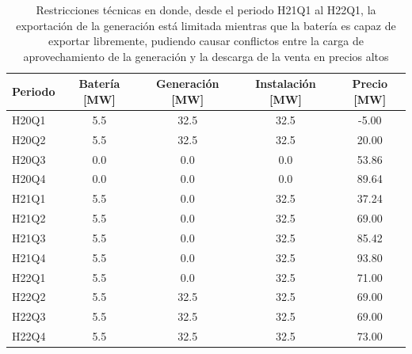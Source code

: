 \begin{table}[ht]
  \centering
  \begin{tabular}{|l|S[table-format=4.1]|S[table-format=4.1]|S[table-format=4.1]|S[table-format=4.2]|}
    \hline
    Periodo & {Batería [\si{\mega\watt}]} & {Generación [\si{\mega\watt}]} & {Instalación [\si{\mega\watt}]}  & {Precio [\si{\mega\watt}]}\\
    \hline
    H20Q1   & 5.5                       & 32.5                         & 32.5                           & -5.00\\
    H20Q2   & 5.5                       & 32.5                         & 32.5                           & 20.00\\
    H20Q3   & 0.0                       &  0.0                         &  0.0                           & 53.86\\
    H20Q4   & 0.0                       &  0.0                         &  0.0                           & 89.64\\
    H21Q1   & 5.5                       &  0.0                         & 32.5                           & 37.24\\
    H21Q2   & 5.5                       &  0.0                         & 32.5                           & 69.00\\
    H21Q3   & 5.5                       &  0.0                         & 32.5                           & 85.42\\
    H21Q4   & 5.5                       &  0.0                         & 32.5                           & 93.80\\
    H22Q1   & 5.5                       &  0.0                         & 32.5                           & 71.00\\
    H22Q2   & 5.5                       & 32.5                         & 32.5                           & 69.00\\
    H22Q3   & 5.5                       & 32.5                         & 32.5                           & 69.00\\
    H22Q4   & 5.5                       & 32.5                         & 32.5                           & 73.00\\
    \hline
  \end{tabular}
  \caption{Restricciones técnicas en donde, desde el periodo H21Q1 al H22Q1, la exportación de la generación está limitada mientras que la batería es capaz de exportar libremente, pudiendo causar conflictos entre la carga de aprovechamiento de la generación y la descarga de la venta en precios altos}
  \label{tab:carga-descarga-simultanea}
\end{table}


